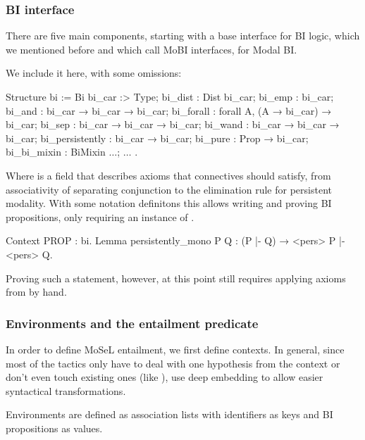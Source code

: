 \subsubsection{BI interface}
\label{subsubsec:bi-interface}

There are five main components, starting with a base interface for BI logic, which we mentioned before and which \citet{krebbersMoSeLGeneralExtensible2018} call MoBI interfaces, for Modal BI.

We include it here, with some omissions:
\begin{coq}
Structure bi := Bi {
  bi_car :> Type;
  bi_dist : Dist bi_car;
  bi_emp : bi_car;
  bi_and : bi_car → bi_car → bi_car;
  bi_forall : forall A, (A → bi_car) → bi_car;
  bi_sep : bi_car → bi_car → bi_car;
  bi_wand : bi_car → bi_car → bi_car;
  bi_persistently : bi_car → bi_car;
  bi_pure : Prop → bi_car;
  bi_bi_mixin : BiMixin $\ldots$;
  $\ldots$
}.
\end{coq}

Where  is a field that describes axioms that connectives should satisfy, from associativity of separating conjunction to the elimination rule for persistent modality.
With some notation definitons this allows writing and proving BI propositions, only requiring an instance of .

\begin{minipage}{\linewidth}
\begin{coq}
Context {PROP : bi}.
Lemma persistently_mono P Q : (P |- Q) → <pers> P |- <pers> Q.
\end{coq}
\end{minipage}

Proving such a statement, however, at this point still requires applying axioms from  by hand.

\subsubsection{Environments and the entailment predicate}
\label{subsubsec:environment-entailment-pred}

In order to define MoSeL entailment, we first define contexts.
In general, since most of the tactics only have to deal with one hypothesis from the context or don't even touch existing ones (like ), \citet{krebbersMoSeLGeneralExtensible2018} use deep embedding to allow easier syntactical transformations.

Environments are defined as association lists with identifiers as keys and BI propositions as values.

